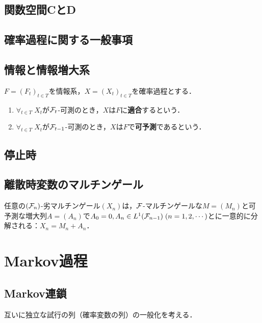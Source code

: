 \documentclass[uplatex,dvipdfmx]{jsreport}
\begin{document}
\section{関数空間CとD}

\section{確率過程に関する一般事項}

\section{情報と情報増大系}

\begin{definition}[adapted]
    $F=(F_t)_{t\in T}$を情報系，$X=(X_t)_{t\in T}$を確率過程とする．
    \begin{enumerate}
        \item $\forall_{t\in T}\;X_t$が$\mathcal{F}_t$-可測のとき，$X$は$F$に\textbf{適合}するという．
        \item $\forall_{t\in T}\;X_t$が$\mathcal{F}_{t-1}$-可測のとき，$X$は$F$で\textbf{可予測}であるという．
    \end{enumerate}
\end{definition}

\section{停止時}

\section{離散時変数のマルチンゲール}

\begin{theorem}
    任意の$(\mathcal{F}_n)$-劣マルチンゲール$(X_n)$は，$\mathcal{F}$-マルチンゲールな$M=(M_n)$と可予測な増大列$A=(A_n)$で$A_0=0,A_n\in L^1(\mathcal{F}_{n-1})\;(n=1,2,\cdots)$とに一意的に分解される：$X_n=M_n+A_n$．
\end{theorem}

\chapter{Markov過程}

\section{Markov連鎖}

\begin{tcolorbox}[colframe=ForestGreen, colback=ForestGreen!10!white,breakable,colbacktitle=ForestGreen!40!white,coltitle=black,fonttitle=\bfseries\sffamily,
title=]
    互いに独立な試行の列（確率変数の列）の一般化を考える．
\end{tcolorbox}
\end{document}
